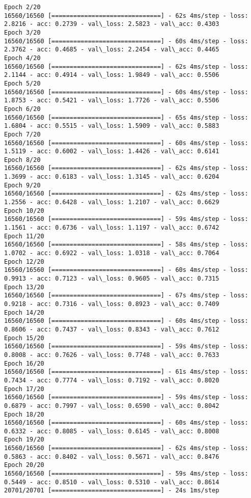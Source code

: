 \documentclass[11pt]{article}
\begin{document}
\begin{Verbatim}[commandchars=\\\{\}]
Epoch 2/20
16560/16560 [==============================] - 62s 4ms/step - loss: 2.8216 - acc: 0.2739 - val\_loss: 2.5823 - val\_acc: 0.4303
Epoch 3/20
16560/16560 [==============================] - 60s 4ms/step - loss: 2.3762 - acc: 0.4685 - val\_loss: 2.2454 - val\_acc: 0.4465
Epoch 4/20
16560/16560 [==============================] - 62s 4ms/step - loss: 2.1144 - acc: 0.4914 - val\_loss: 1.9849 - val\_acc: 0.5506
Epoch 5/20
16560/16560 [==============================] - 60s 4ms/step - loss: 1.8753 - acc: 0.5421 - val\_loss: 1.7726 - val\_acc: 0.5506
Epoch 6/20
16560/16560 [==============================] - 65s 4ms/step - loss: 1.6804 - acc: 0.5515 - val\_loss: 1.5909 - val\_acc: 0.5883
Epoch 7/20
16560/16560 [==============================] - 60s 4ms/step - loss: 1.5119 - acc: 0.6002 - val\_loss: 1.4426 - val\_acc: 0.6141
Epoch 8/20
16560/16560 [==============================] - 62s 4ms/step - loss: 1.3699 - acc: 0.6183 - val\_loss: 1.3145 - val\_acc: 0.6204
Epoch 9/20
16560/16560 [==============================] - 62s 4ms/step - loss: 1.2556 - acc: 0.6428 - val\_loss: 1.2107 - val\_acc: 0.6629
Epoch 10/20
16560/16560 [==============================] - 59s 4ms/step - loss: 1.1561 - acc: 0.6736 - val\_loss: 1.1197 - val\_acc: 0.6742
Epoch 11/20
16560/16560 [==============================] - 58s 4ms/step - loss: 1.0702 - acc: 0.6922 - val\_loss: 1.0318 - val\_acc: 0.7064
Epoch 12/20
16560/16560 [==============================] - 60s 4ms/step - loss: 0.9913 - acc: 0.7123 - val\_loss: 0.9605 - val\_acc: 0.7315
Epoch 13/20
16560/16560 [==============================] - 67s 4ms/step - loss: 0.9218 - acc: 0.7316 - val\_loss: 0.8923 - val\_acc: 0.7409
Epoch 14/20
16560/16560 [==============================] - 60s 4ms/step - loss: 0.8606 - acc: 0.7437 - val\_loss: 0.8343 - val\_acc: 0.7612
Epoch 15/20
16560/16560 [==============================] - 59s 4ms/step - loss: 0.8008 - acc: 0.7626 - val\_loss: 0.7748 - val\_acc: 0.7633
Epoch 16/20
16560/16560 [==============================] - 61s 4ms/step - loss: 0.7434 - acc: 0.7774 - val\_loss: 0.7192 - val\_acc: 0.8020
Epoch 17/20
16560/16560 [==============================] - 59s 4ms/step - loss: 0.6879 - acc: 0.7997 - val\_loss: 0.6590 - val\_acc: 0.8042
Epoch 18/20
16560/16560 [==============================] - 60s 4ms/step - loss: 0.6332 - acc: 0.8085 - val\_loss: 0.6145 - val\_acc: 0.8008
Epoch 19/20
16560/16560 [==============================] - 62s 4ms/step - loss: 0.5863 - acc: 0.8402 - val\_loss: 0.5671 - val\_acc: 0.8476
Epoch 20/20
16560/16560 [==============================] - 59s 4ms/step - loss: 0.5449 - acc: 0.8510 - val\_loss: 0.5310 - val\_acc: 0.8614
20701/20701 [==============================] - 24s 1ms/step

    \end{Verbatim}
\end{document}
